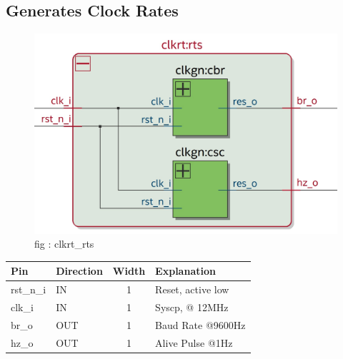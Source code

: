 \documentclass[12pt,a4 paper] {article}
\begin{document}
\subsection{Generates Clock Rates}
\begin{figure}[h]
	\centering
	\includegraphics[scale=0.3]{../png/clkrt_rts.png}
	\newline
	fig : clkrt\_rts \\
\end{figure}

\begin{center}
	\begin{tabular}{| p{2cm} | p{2cm} | c| p{4cm} |}
		\hline
		Pin & Direction & Width & Explanation\\
		\hline	
		rst\_n\_i & IN & 1 &  Reset, active low\\
		\hline
		clk\_i & IN & 1 & Syscp, @ 12MHz \\
		\hline
		br\_o & OUT &   1    &  Baud Rate @9600Hz\\
		\hline
		hz\_o  &  OUT &   1  &  Alive Pulse @1Hz\\
		\hline
	\end{tabular}
\end{center}
\newpage
\end{document}
